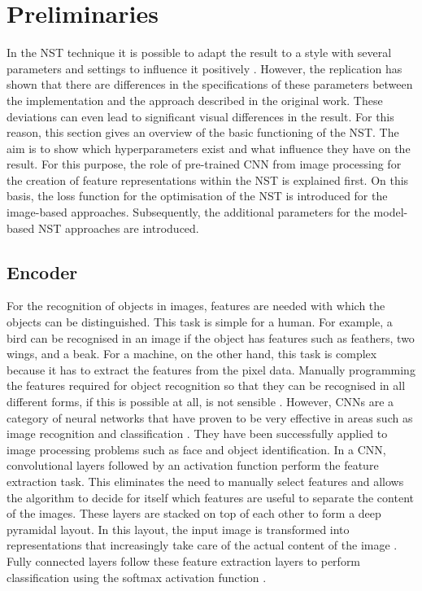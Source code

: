 \section{Preliminaries} \label{sec:preliminaries}
In the \gls{NST} technique it is possible to adapt the result to a style with several parameters and settings to influence it positively \cite{GEB2016}. However, the replication has shown that there are differences in the specifications of these parameters between the implementation and the approach described in the original work. These deviations can even lead to significant visual differences in the result. For this reason, this section gives an overview of the basic functioning of the \gls{NST}. The aim is to show which hyperparameters exist and what influence they have on the result. For this purpose, the role of pre-trained \gls{CNN} from image processing for the creation of feature representations within the \gls{NST} is explained first. On this basis, the loss function for the optimisation of the \gls{NST} is introduced for the image-based approaches. Subsequently, the additional parameters for the model-based \gls{NST} approaches are introduced. 

\subsection{Encoder} \label{sec:encoder}
For the recognition of objects in images, features are needed with which the objects can be distinguished. This task is simple for a human. For example, a bird can be recognised in an image if the object has features such as feathers, two wings, and a beak. For a machine, on the other hand, this task is complex because it has to extract the features from the pixel data. Manually programming the features required for object recognition so that they can be recognised in all different forms, if this is possible at all, is not sensible \cite{Alp2020}. However, \glspl{CNN} are a category of neural networks that have proven to be very effective in areas such as image recognition and classification \cite{SZ2015,He2016}. They have been successfully applied to image processing problems such as face and object identification. In a \gls{CNN}, convolutional layers followed by an activation function perform the feature extraction task. This eliminates the need to manually select features and allows the algorithm to decide for itself which features are useful to separate the content of the images. These layers are stacked on top of each other to form a deep pyramidal layout. In this layout, the input image is transformed into representations that increasingly take care of the actual content of the image \cite{ZF2014}. Fully connected layers follow these feature extraction layers to perform classification using the softmax activation function \cite{Alp2020}. 

